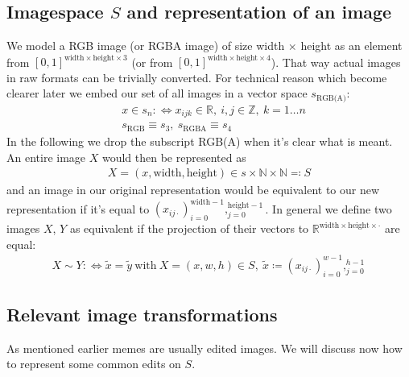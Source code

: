 \documentclass{article}
\begin{document}
\subsection{Imagespace $S$ and representation of an image}
We model a RGB image (or RGBA image) of size width $\times$ height as an element from $[0, 1]^{\text{width} \times\text{height} \times 3}$ (or from $[0, 1]^{\text{width} \times\text{height} \times 4}$). That way actual images in raw formats can be trivially converted. For technical reason which become clearer later we embed our set of all images in a vector space $s_\text{RGB(A)}$:
\begin{align}
&x \in s_n :\Leftrightarrow x_{ijk} \in \mathbb R,\ i, j \in \mathbb Z,\ k =1\dots n\\
&s_\text{RGB} \equiv s_3, \ s_\text{RGBA} \equiv s_4
\end{align}
In the following we drop the subscript RGB(A) when it's clear what is meant.\\
An entire image $X$ would then be represented as
\begin{align}
X = (x, \text{width}, \text{height}) \in s \times \mathbb N \times \mathbb N \eqqcolon S
\end{align}
and an image in our original representation would be equivalent to our new representation if it's equal to $\left. (x_{ij\cdot})_{i=0}^{\text{width}-1} \right.,_{j=0}^{\text{height}-1}$. In general we define two images $X$, $Y$ as equivalent if the projection of their vectors to $\mathbb R^{\text{width}\times\text{height}\times\cdot}$ are equal:
\begin{align}
X \sim Y :\Leftrightarrow \tilde x = \tilde y\ \text{with}\ X = (x, w, h) \in S,\ \tilde x \coloneqq \left. (x_{ij\cdot})_{i=0}^{w-1} \right.,_{j=0}^{h-1}
\end{align}

\subsection{Relevant image transformations}
As mentioned earlier memes are usually edited images. We will discuss now how to represent some common edits on $S$.
\end{document}
